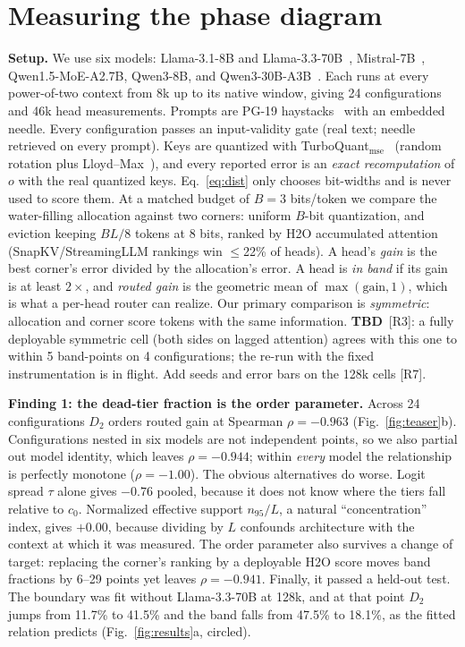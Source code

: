 \documentclass{article} %
\newcommand{\tbd}[1]{{\color{tbdcol}\textbf{TBD}~#1}}
\theoremstyle{definition}
\begin{document}
\section{Measuring the phase diagram}
\label{sec:results}

\textbf{Setup.} We use six models: Llama-3.1-8B and Llama-3.3-70B~\citep{grattafiori2024llama3}, Mistral-7B~\citep{jiang2023mistral}, Qwen1.5-MoE-A2.7B, Qwen3-8B, and Qwen3-30B-A3B~\citep{yang2025qwen3}. Each runs at every power-of-two context from 8k up to its native window, giving 24 configurations and 46k head measurements. Prompts are PG-19 haystacks~\citep{rae2020pg19} with an embedded needle. Every configuration passes an input-validity gate (real text; needle retrieved on every prompt). Keys are quantized with TurboQuant$_\text{mse}$~\citep{zandieh2025turboquant} (random rotation plus Lloyd--Max~\citep{lloyd1982least}), and every reported error is an \emph{exact recomputation} of $o$ with the real quantized keys. Eq.~\ref{eq:dist} only chooses bit-widths and is never used to score them. At a matched budget of $B{=}3$ bits/token we compare the water-filling allocation against two corners: uniform $B$-bit quantization, and eviction keeping $BL/8$ tokens at 8 bits, ranked by H2O accumulated attention (SnapKV/StreamingLLM rankings win $\le$22\% of heads). A head's \emph{gain} is the best corner's error divided by the allocation's error. A head is \emph{in band} if its gain is at least $2\times$, and \emph{routed gain} is the geometric mean of $\max(\text{gain},1)$, which is what a per-head router can realize. Our primary comparison is \emph{symmetric}: allocation and corner score tokens with the same information. \tbd{[R3]: a fully deployable symmetric cell (both sides on lagged attention) agrees with this one to within 5 band-points on 4 configurations; the re-run with the fixed instrumentation is in flight. Add seeds and error bars on the 128k cells [R7].}

\textbf{Finding 1: the dead-tier fraction is the order parameter.} Across 24 configurations $D_2$ orders routed gain at Spearman $\rho=-0.963$ (Fig.~\ref{fig:teaser}b). Configurations nested in six models are not independent points, so we also partial out model identity, which leaves $\rho=-0.944$; within \emph{every} model the relationship is perfectly monotone ($\rho=-1.00$). The obvious alternatives do worse. Logit spread $\tau$ alone gives $-0.76$ pooled, because it does not know where the tiers fall relative to $c_0$. Normalized effective support $n_{95}/L$, a natural ``concentration'' index, gives $+0.00$, because dividing by $L$ confounds architecture with the context at which it was measured. The order parameter also survives a change of target: replacing the corner's ranking by a deployable H2O score moves band fractions by 6--29 points yet leaves $\rho=-0.941$. Finally, it passed a held-out test. The boundary was fit without Llama-3.3-70B at 128k, and at that point $D_2$ jumps from 11.7\% to 41.5\% and the band falls from 47.5\% to 18.1\%, as the fitted relation predicts (Fig.~\ref{fig:results}a, circled).
\end{document}
